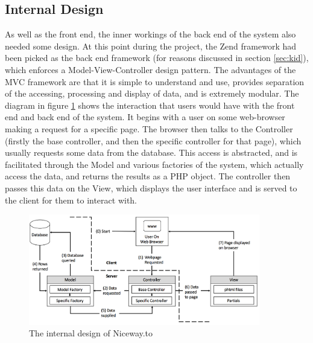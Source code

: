 \newpage 
\subsection{Internal Design}
As well as the front end, the inner workings of the back end of the system also needed some design. At this point during the project, the Zend framework had been picked as the back end framework (for reasons discussed in section \ref{sec:kid}), which enforces a Model-View-Controller design pattern. The advantages of the MVC framework are that it is simple to understand and use, provides separation of the accessing, processing and display of data, and is extremely modular. The diagram in figure \ref{fig:mvc} shows the interaction that users would have with the front end and back end of the system. It begins with a user on some web-browser making a request for a specific page. The browser then talks to the Controller (firstly the base controller, and then the specific controller for that page), which usually requests some data from the database. This access is abstracted, and is facilitated through the Model and various factories of the system, which actually access the data, and returns the results as a PHP object. The controller then passes this data on the View, which displays the user interface and is served to the client for them to interact with.

\begin{figure}[!ht]
	\begin{center}
		\includegraphics[width=0.9\textwidth]{images/design/internal.png}
	\end{center}
	\vspace{-6mm}
	\caption{The internal design of Niceway.to}
	\label{fig:mvc}
\end{figure}

